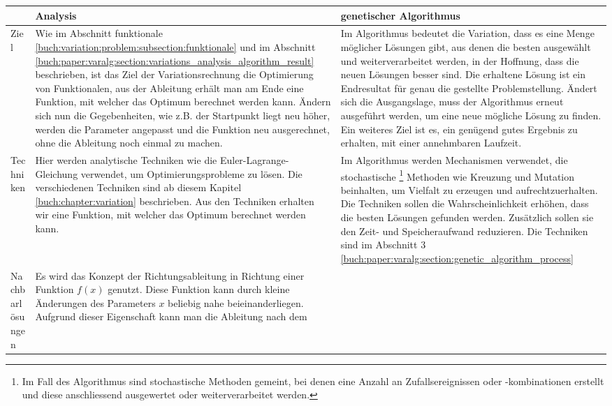\begin{xltabular}{\textwidth}{|L|X|X|}
   \hline
   & Analysis 
   & genetischer Algorithmus 
   \\ \hline
   Ziel
   & 
   Wie im Abschnitt funktionale \ref{buch:variation:problem:subsection:funktionale} und
   im Abschnitt \ref{buch:paper:varalg:section:variations_analysis_algorithm_result}
   beschrieben, ist das Ziel der Variationsrechnung die Optimierung von Funktionalen, aus der
   Ableitung erhält man am Ende eine Funktion, mit welcher das Optimum berechnet werden kann. 
   Ändern sich nun die Gegebenheiten, wie z.B. der Startpunkt liegt neu höher, werden die Parameter 
   angepasst und die Funktion neu ausgerechnet, ohne die Ableitung noch einmal zu machen.
   & 
   Im Algorithmus bedeutet die Variation, dass es eine Menge möglicher Lösungen gibt, 
   aus denen die besten ausgewählt und weiterverarbeitet werden, in der 
   Hoffnung, dass die neuen Lösungen besser sind. Die erhaltene Lösung ist ein Endresultat für
   genau die gestellte Problemstellung. Ändert sich die Ausgangslage, muss der Algorithmus
   erneut ausgeführt werden, um eine neue mögliche Lösung zu finden. Ein weiteres Ziel ist es,
   ein genügend gutes Ergebnis zu erhalten, mit einer annehmbaren Laufzeit.
   \\ \hline
   Techniken  
   & 
   Hier werden analytische Techniken wie die Euler-Lagrange-Gleichung verwendet, 
   um Optimierungsprobleme zu lösen. Die verschiedenen Techniken sind ab diesem Kapitel
   \ref{buch:chapter:variation} beschrieben. Aus den Techniken erhalten wir eine Funktion,
   mit welcher das Optimum berechnet werden kann.
   & Im Algorithmus werden Mechanismen verwendet, die stochastische
   \footnote{
      Im Fall des Algorithmus sind stochastische Methoden gemeint, bei denen 
      eine Anzahl an Zufallsereignissen oder -kombinationen erstellt und 
      diese anschliessend ausgewertet oder weiterverarbeitet werden.
   }
   Methoden wie Kreuzung und Mutation beinhalten, um Vielfalt zu erzeugen und aufrechtzuerhalten.
   Die Techniken sollen die Wahrscheinlichkeit erhöhen, dass die besten Lösungen gefunden werden.
   Zusätzlich sollen sie den Zeit- und Speicheraufwand reduzieren.
   Die Techniken sind im Abschnitt 3 \ref{buch:paper:varalg:section:genetic_algorithm_process}
   \\ \hline
   Nachbarlösungen
   & 
   Es wird das Konzept der Richtungsableitung in Richtung einer Funktion \(f(x)\)
   genutzt. Diese Funktion kann durch kleine Änderungen des Parameters \(x\) beliebig
   nahe beieinanderliegen. Aufgrund dieser Eigenschaft kann man die Ableitung nach dem

\end{xltabular}
